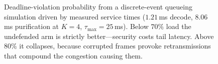 \begin{figure}[!t]
\centering
{}
\caption{Deadline-violation probability from a discrete-event
queueing simulation driven by measured service times
($1.21$\,ms decode, $8.06$\,ms purification at $K=4$,
$\tau_{\max}=25$\,ms). Below $70\%$ load the undefended arm is
strictly better---security costs tail latency. Above $80\%$ it
collapses, because corrupted frames provoke retransmissions that
compound the congestion causing them.}
\label{fig:e6}
\end{figure}
